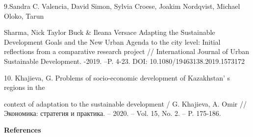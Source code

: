 \begin{references}
9.Sandra C. Valencia, David Simon, Sylvia Croese, Joakim Nordqvist,
Michael Oloko, Tarun

Sharma, Nick Taylor Buck \& Ileana Versace Adapting the Sustainable
Development Goals and the New Urban Agenda to the city level: Initial
reflections from a comparative research project // International Journal
of Urban Sustainable Development. -2019. --P. 4-23. DOI:
10.1080/19463138.2019.1573172

10. Khajieva, G. Problems of socio-economic development of
Kazakhstan' s regions in the

context of adaptation to the sustainable development / G. Khajieva, A.
Omir // Экономика: стратегия и практика. -- 2020. -- Vol. 15, No. 2. --
P. 175-186.
\end{references}

\begin{center}
{\bfseries References}
\end{center}


